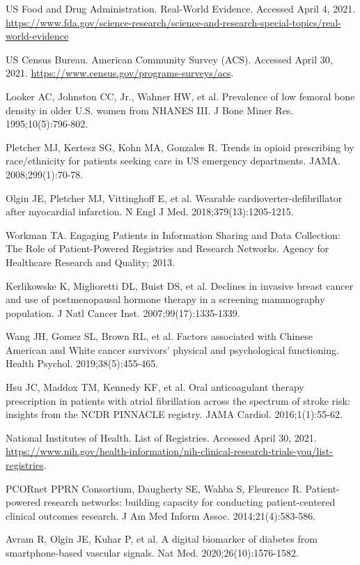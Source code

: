 \begin{references}
\item US Food and Drug Administration. Real-World Evidence. Accessed April 4, 2021. \url{https://www.fda.gov/science-research/science-and-research-special-topics/real-world-evidence}
\item US Census Bureau. American Community Survey (ACS). Accessed April 30, 2021. \url{https://www.census.gov/programs-surveys/acs}.
\item Looker AC, Johnston CC, Jr., Wahner HW, et al. Prevalence of low femoral bone density in older U.S. women from NHANES III. J Bone Miner Res. 1995;10(5):796-802.
\item Pletcher MJ, Kertesz SG, Kohn MA, Gonzales R. Trends in opioid prescribing by race/ethnicity for patients seeking care in US emergency departments. JAMA. 2008;299(1):70-78.
\item Olgin JE, Pletcher MJ, Vittinghoff E, et al. Wearable cardioverter-defibrillator after myocardial infarction. N Engl J Med. 2018;379(13):1205-1215.
\item Workman TA. Engaging Patients in Information Sharing and Data Collection: The Role of Patient-Powered Registries and Research Networks. Agency for Healthcare Research and Quality; 2013.
\item Kerlikowske K, Miglioretti DL, Buist DS, et al. Declines in invasive breast cancer and use of postmenopausal hormone therapy in a screening mammography population. J Natl Cancer Inst. 2007;99(17):1335-1339.
\item Wang JH, Gomez SL, Brown RL, et al. Factors associated with Chinese American and White cancer survivors’ physical and psychological functioning. Health Psychol. 2019;38(5):455-465.
\item Hsu JC, Maddox TM, Kennedy KF, et al. Oral anticoagulant therapy prescription in patients with atrial fibrillation across the spectrum of stroke risk: insights from the NCDR PINNACLE registry. JAMA Cardiol. 2016;1(1):55-62.
\item National Institutes of Health. List of Registries. Accessed April 30, 2021. \url{https://www.nih.gov/health-information/nih-clinical-research-trials-you/list-registries}.
\item PCORnet PPRN Consortium, Daugherty SE, Wahba S, Fleurence R. Patient-powered research networks: building capacity for conducting patient-centered clinical outcomes research. J Am Med Inform Assoc. 2014;21(4):583-586.
\item Avram R, Olgin JE, Kuhar P, et al. A digital biomarker of diabetes from smartphone-based vascular signals. Nat Med. 2020;26(10):1576-1582.

\end{references}
